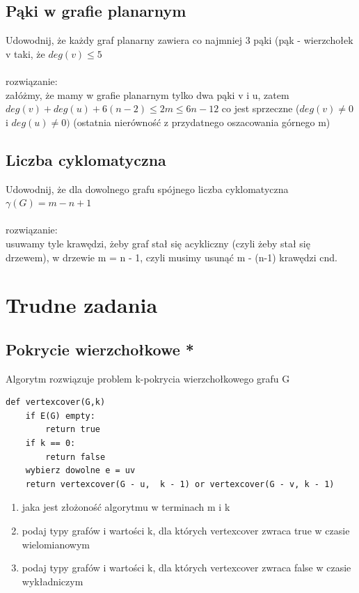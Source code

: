 \documentclass{article}
\begin{document}
\subsection*{Pąki w grafie planarnym}
Udowodnij, że każdy graf planarny zawiera co najmniej 3 pąki (pąk - wierzchołek v taki, że $deg(v) \leq 5$ \\\\
rozwiązanie:\\
załóżmy, że mamy w grafie planarnym tylko dwa pąki v i u,  zatem 
$deg(v) + deg(u) + 6(n-2) \leq 2m \leq 6n - 12 $ co jest sprzeczne ($deg(v) \ne 0$ i $deg(u) \ne 0)$ (ostatnia nierówność z przydatnego oszacowania górnego m) 

\subsection*{Liczba cyklomatyczna}
Udowodnij, że dla dowolnego grafu spójnego liczba cyklomatyczna $\gamma(G) = m - n + 1$ \\\\ rozwiązanie: \\
usuwamy tyle krawędzi, żeby graf stał się acykliczny (czyli żeby stał się drzewem), w drzewie m = n - 1, czyli musimy usunąć m - (n-1) krawędzi cnd. 

\section{Trudne zadania}
\subsection*{Pokrycie wierzchołkowe *}
Algorytm rozwiązuje problem k-pokrycia wierzchołkowego grafu G
\begin{lstlisting}
def vertexcover(G,k)
	if E(G) empty: 
		return true
	if k == 0:
		return false
	wybierz dowolne e = uv
	return vertexcover(G - u,  k - 1) or vertexcover(G - v, k - 1)
\end{lstlisting}
\begin{enumerate}
	\item jaka jest złożoność algorytmu w terminach m i k
	\item podaj typy grafów i wartości k, dla których vertexcover zwraca true w czasie wielomianowym
	\item podaj typy grafów i wartości k, dla których vertexcover zwraca false w czasie wykładniczym
\end{enumerate}
\end{document}
